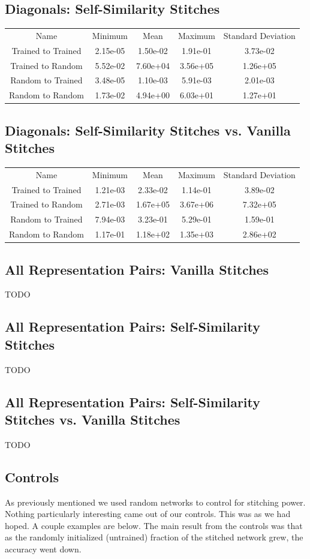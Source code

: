 \documentclass{article} %
\begin{document}
   
\subsection*{Diagonals: Self-Similarity Stitches}
\begin{tabular}{c c c c c}
   Name&Minimum&Mean&Maximum&Standard Deviation\\
   Trained to Trained&2.15e-05&1.50e-02&1.91e-01&3.73e-02\\
   Trained to Random&5.52e-02&7.60e+04&3.56e+05&1.26e+05\\
   Random to Trained&3.48e-05&1.10e-03&5.91e-03&2.01e-03\\
   Random to Random&1.73e-02&4.94e+00&6.03e+01&1.27e+01\\
\end{tabular}

\subsection*{Diagonals: Self-Similarity Stitches vs. Vanilla Stitches}
\begin{tabular}{c c c c c}
   Name&Minimum&Mean&Maximum&Standard Deviation\\
   Trained to Trained&1.21e-03&2.33e-02&1.14e-01&3.89e-02\\
   Trained to Random&2.71e-03&1.67e+05&3.67e+06&7.32e+05\\
   Random to Trained&7.94e-03&3.23e-01&5.29e-01&1.59e-01\\
   Random to Random&1.17e-01&1.18e+02&1.35e+03&2.86e+02\\
\end{tabular}

\subsection*{All Representation Pairs: Vanilla Stitches}
TODO

\subsection*{All Representation Pairs: Self-Similarity Stitches}
TODO

\subsection*{All Representation Pairs: Self-Similarity Stitches vs. Vanilla Stitches}
TODO
   

\subsection*{Controls}
As previously mentioned we used random networks to control for stitching power. Nothing particularly interesting
came out of our controls. This was as we had hoped. A couple examples are below. The main result from the controls
was that as the randomly initialized (untrained) fraction of the stitched network grew, the accuracy went down.
\end{document}
